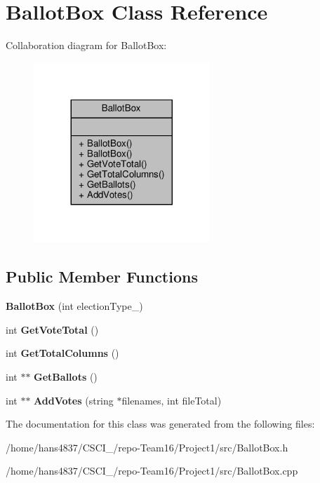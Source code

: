 \hypertarget{classBallotBox}{}\section{Ballot\+Box Class Reference}
\label{classBallotBox}


Collaboration diagram for Ballot\+Box\+:\nopagebreak
\begin{figure}[H]
\begin{center}
\leavevmode
\includegraphics[width=188pt]{classBallotBox__coll__graph}
\end{center}
\end{figure}
\subsection*{Public Member Functions}
\begin{DoxyCompactItemize}
\item 
\mbox{\label{classBallotBox_ae1a3df998fab9d6e3d047831f9b68739}} 
{\bfseries Ballot\+Box} (int election\+Type\+\_\+)
\item 
\mbox{\label{classBallotBox_a67de3fc3194d03e45f23cb50c5d49f08}} 
int {\bfseries Get\+Vote\+Total} ()
\item 
\mbox{\label{classBallotBox_aa8a05c3bd77b31b6d1845830aff6826e}} 
int {\bfseries Get\+Total\+Columns} ()
\item 
\mbox{\label{classBallotBox_acc0a077b87fb2705e67de17b9263b629}} 
int $\ast$$\ast$ {\bfseries Get\+Ballots} ()
\item 
\mbox{\label{classBallotBox_a54b15e3c3feb53dd4578843a28d418b7}} 
int $\ast$$\ast$ {\bfseries Add\+Votes} (string $\ast$filenames, int file\+Total)
\end{DoxyCompactItemize}


The documentation for this class was generated from the following files\+:\begin{DoxyCompactItemize}
\item 
/home/hans4837/\+C\+S\+C\+I\+\_/repo-\/\+Team16/\+Project1/src/Ballot\+Box.\+h\item 
/home/hans4837/\+C\+S\+C\+I\+\_/repo-\/\+Team16/\+Project1/src/Ballot\+Box.\+cpp\end{DoxyCompactItemize}
